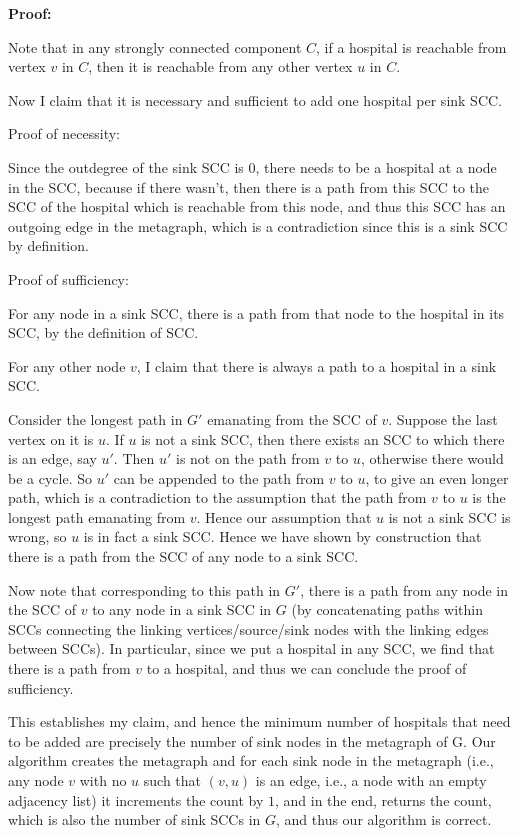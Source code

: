 \documentclass[answers]{exam}
\begin{document}
\begin{questions}
\begin{solution}
\textbf{Proof:}

Note that in any strongly connected component $C$, if a hospital is reachable from vertex $v$ in $C$, then it is reachable from any other vertex $u$ in $C$.

Now I claim that it is necessary and sufficient to add one hospital per sink SCC.

Proof of necessity:

Since the outdegree of the sink SCC is $0$, there needs to be a hospital at a node in the SCC, because if there wasn't, then there is a path from this SCC to the SCC of the hospital which is reachable from this node, and thus this SCC has an outgoing edge in the metagraph, which is a contradiction since this is a sink SCC by definition.

Proof of sufficiency:

For any node in a sink SCC, there is a path from that node to the hospital in its SCC, by the definition of SCC.

For any other node $v$, I claim that there is always a path to a hospital in a sink SCC.

Consider the longest path in $G'$ emanating from the SCC of $v$. Suppose the last vertex on it is $u$. If $u$ is not a sink SCC, then there exists an SCC to which there is an edge, say $u'$. Then
    $u'$ is not on the path from $v$ to $u$, otherwise there would be a cycle. So $u'$ can be appended to the path from $v$ to $u$, to give an even longer path, which is a contradiction to the
    assumption that the path from $v$ to $u$ is the longest path emanating from $v$. Hence our assumption that $u$ is not a sink SCC is wrong, so $u$ is in fact a sink SCC. Hence we have shown by construction that there is a path from the SCC of any node to a sink SCC.

Now note that corresponding to this path in $G'$, there is a path from any node in the SCC of $v$ to any node in a sink SCC in $G$ (by concatenating paths within SCCs connecting the linking
    vertices/source/sink nodes with the linking edges between SCCs). In particular, since we put a hospital in any SCC, we find that there is a path from $v$ to a hospital, and thus we can conclude
    the proof of sufficiency.

This establishes my claim, and hence the minimum number of hospitals that need to be added are precisely the number of sink nodes in the metagraph of G. Our algorithm creates the metagraph and for
    each sink node in the metagraph (i.e., any node $v$ with no $u$ such that $(v, u)$ is an edge, i.e., a node with an empty adjacency list) it increments the count by $1$, and in the end, returns
    the count, which is also the number of sink SCCs in $G$, and thus our algorithm is correct.



\end{solution}
\end{questions}
\end{document}
